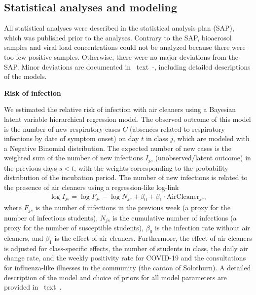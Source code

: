 \documentclass[fleqn,11pt]{wlscirep}
\begin{document}
\subsection{Statistical analyses and modeling}

All statistical analyses were described in the statistical analysis plan (SAP)\cite{Banholzer2023SAP}, which was published prior to the analyses. Contrary to the SAP, bioaerosol samples and viral load concentrations could not be analyzed because there were too few positive samples. Otherwise, there were no major deviations from the SAP. Minor deviations are documented in \supp~text~-, including detailed descriptions of the models. \medskip

\noindent\textbf{Risk of infection} \smallskip

\noindent We estimated the relative risk of infection with air cleaners using a Bayesian latent variable hierarchical regression model. The observed outcome of this model is the number of new respiratory cases $C$ (absences related to respiratory infections by date of symptom onset) on day $t$ in class $j$, which are modeled with a Negative Binomial distribution. The expected number of new cases is the weighted sum of the number of new infections $I_{js}$ (unobserved/latent outcome) in the previous days $s<t$, with the weights corresponding to the probability distribution of the incubation period. The number of new infections is related to the presence of air cleaners using a regression-like log-link
\begin{align}
    \log I_{js} = \log F_{js} - \log N_{js} + \beta_0 + \beta_1 \cdot \text{AirCleaner}_{js},
\end{align}
where $F_{js}$ is the number of infections in the previous week (a proxy for the number of infectious students), $N_{js}$ is the cumulative number of infections (a proxy for the number of susceptible students), $\beta_0$ is the infection rate without air cleaners, and $\beta_1$ is the effect of air cleaners. Furthermore, the effect of air cleaners is adjusted for class-specific effects, the number of students in class, the daily air change rate, and the weekly positivity rate for COVID-19 and the consultations for influenza-like illnesses in the community (\ie the canton of Solothurn). A detailed description of the model and choice of priors for all model parameters are provided in \supp~text~. %
\end{document}
